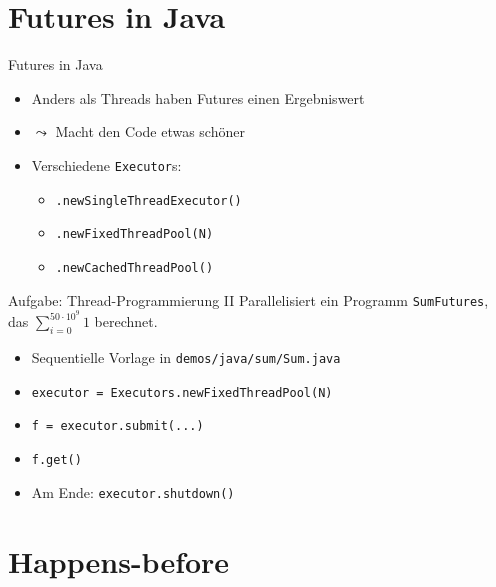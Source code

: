 \documentclass{beamer}
\newcommand{\code}[1]{
	\begin{mdframed}
		
	\end{mdframed}
}
\begin{document}
\section{Futures in Java}

\begin{frame}{Futures in Java}
    \code{code/futures.java}

    \begin{itemize}
        \item Anders als Threads haben Futures einen Ergebniswert
        \item $\leadsto$ Macht den Code etwas schöner
        \item Verschiedene \texttt{Executor}s:
        \begin{itemize}
            \item \texttt{.newSingleThreadExecutor()}
            \item \texttt{.newFixedThreadPool(N)}
            \item \texttt{.newCachedThreadPool()}
        \end{itemize}
    \end{itemize}
\end{frame}

\begin{frame}{Aufgabe: Thread-Programmierung II}
    Parallelisiert ein Programm \texttt{SumFutures}, das $\sum^{50 \cdot 10^9}_{i = 0} 1$ berechnet.

    \begin{itemize}
        \item Sequentielle Vorlage in \texttt{demos/java/sum/Sum.java}
        \item \texttt{executor = Executors.newFixedThreadPool(N)}
        \item \texttt{f = executor.submit(...)}
        \item \texttt{f.get()}
        \item Am Ende: \texttt{executor.shutdown()}
    \end{itemize}
\end{frame}

\section{Happens-before}
\end{document}
